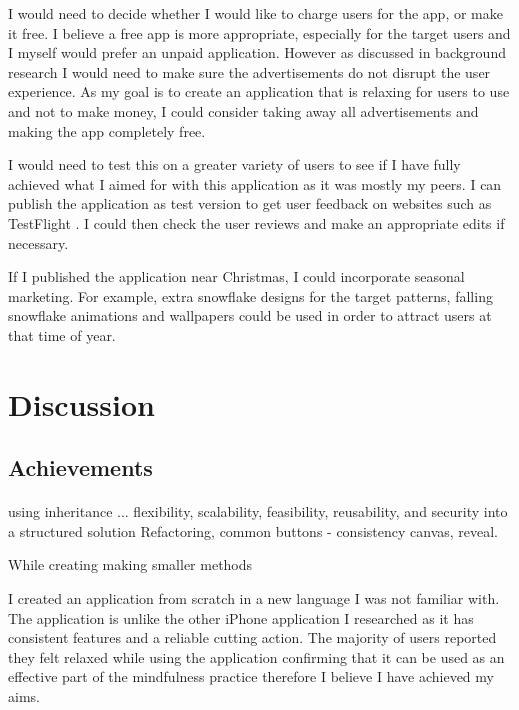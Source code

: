 \documentclass[11pt]{article}
\begin{document}
        I would need to decide whether I would like to charge users for the app, or make it free. I believe a free app is more appropriate, especially for the target users and I myself would prefer an unpaid application. However as discussed in background research I would need to make sure the advertisements do not disrupt the user experience. As my goal is to create an application that is relaxing for users to use and not to make money, I could consider taking away all advertisements and making the app completely free.
        
        I would need to test this on a greater variety of users to see if I have fully achieved what I aimed for with this application as it was mostly my peers.  I can publish the application as test version to get user feedback on websites such as TestFlight \cite{TestFlight}.
        I could then check the user reviews and make an appropriate edits if necessary. 
        
        If I published the application near Christmas, I could incorporate seasonal marketing. For example, extra snowflake designs for the target patterns, falling snowflake animations and wallpapers could be used in order to attract users at that time of year.
        
\newpage
\section{Discussion}
    \subsection{Achievements}
        \paragraph{}
        using inheritance ... 
         flexibility, scalability, feasibility, reusability, and security into a structured solution
         Refactoring, 
         common buttons - consistency
         canvas, reveal. 
        
        While creating making smaller methods
        
        I created an application from scratch in a new language I was not familiar with. The application is unlike the other iPhone application I researched as it has consistent features and a reliable cutting action. The majority of users reported they felt relaxed while using the application confirming that it can be used as an effective part of the mindfulness practice therefore I believe I have achieved my aims. 
        
\end{document}
